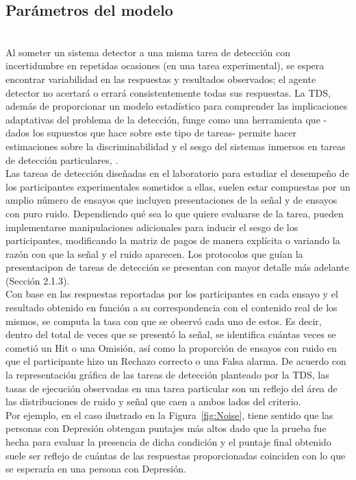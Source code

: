 \subsection{Parámetros del modelo}\\

Al someter un sistema detector a una misma tarea de detección con incertidumbre en repetidas ocasiones (en una tarea experimental), se espera encontrar variabilidad en las respuestas y resultados observados; el agente detector no acertará o errará consistentemente todas sus respuestas. La TDS, además de proporcionar un modelo estadístico para comprender las implicaciones adaptativas del problema de la detección, funge como una herramienta que -dados los supuestos que hace sobre este tipo de tareas- permite hacer estimaciones sobre la discriminabilidad y el sesgo del sistemas inmersos en tareas de detección particulares, \parencite{McNicol1}.\\

Las tareas de detección diseñadas en el laboratorio para estudiar el desempeño de los participantes experimentales sometidos a ellas, suelen estar compuestas por un amplio número de ensayos que incluyen presentaciones de la señal y de ensayos con puro ruido. Dependiendo qué sea lo que quiere evaluarse de la tarea, pueden implementarse manipulaciones adicionales para inducir el sesgo de los participantes, modificando la matriz de pagos de manera explícita o variando la razón con que la señal y el ruido aparecen. Los protocolos que guían la presentacipon de tareas de detección se presentan con mayor detalle más adelante (Sección 2.1.3).\\

Con base en las respuestas reportadas por los participantes en cada ensayo y el resultado obtenido en función a su correspondencia con el contenido real de los mismos, se computa la tasa con que se observó cada uno de estos. Es decir, dentro del total de veces que se presentó la señal, se identifica cuántas veces se cometió un Hit o una Omisión, así como la proporción de ensayos con ruido en que el participante hizo un Rechazo correcto o una Falsa alarma. De acuerdo con la representación gráfica de las tareas de detección planteado por la TDS, las tasas de ejecución observadas en una tarea particular son un reflejo del área de las distribuciones de ruido y señal que caen a ambos lados del criterio.\\

Por ejemplo, en el caso ilustrado en la Figura~\ref{fig:Noise}, tiene sentido que las personas con Depresión obtengan puntajes más altos dado que la prueba fue hecha para evaluar la presencia de dicha condición y el puntaje final obtenido suele ser reflejo de cuántas de las respuestas proporcionadas coinciden con lo que se esperaría en una persona con Depresión.\\

